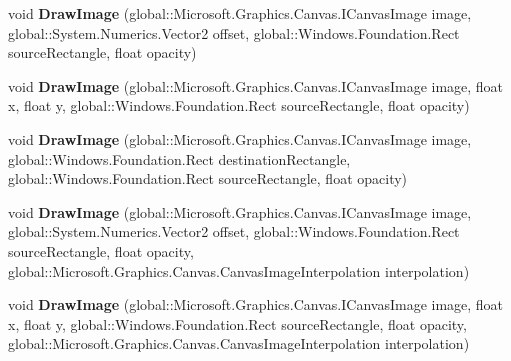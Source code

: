 \begin{DoxyCompactItemize}
void {\bfseries Draw\+Image} (global\+::\+Microsoft.\+Graphics.\+Canvas.\+I\+Canvas\+Image image, global\+::\+System.\+Numerics.\+Vector2 offset, global\+::\+Windows.\+Foundation.\+Rect source\+Rectangle, float opacity)
\item 
\mbox{\label{interface_microsoft_1_1_graphics_1_1_canvas_1_1_i_canvas_drawing_session_a21d76b9febfc14d4e7de5fc50a90605d}} 
void {\bfseries Draw\+Image} (global\+::\+Microsoft.\+Graphics.\+Canvas.\+I\+Canvas\+Image image, float x, float y, global\+::\+Windows.\+Foundation.\+Rect source\+Rectangle, float opacity)
\item 
\mbox{\label{interface_microsoft_1_1_graphics_1_1_canvas_1_1_i_canvas_drawing_session_aa765d0fa935b76101e503c6434376586}} 
void {\bfseries Draw\+Image} (global\+::\+Microsoft.\+Graphics.\+Canvas.\+I\+Canvas\+Image image, global\+::\+Windows.\+Foundation.\+Rect destination\+Rectangle, global\+::\+Windows.\+Foundation.\+Rect source\+Rectangle, float opacity)
\item 
\mbox{\label{interface_microsoft_1_1_graphics_1_1_canvas_1_1_i_canvas_drawing_session_a9e068a61002b3491bc70ea21e2ee8517}} 
void {\bfseries Draw\+Image} (global\+::\+Microsoft.\+Graphics.\+Canvas.\+I\+Canvas\+Image image, global\+::\+System.\+Numerics.\+Vector2 offset, global\+::\+Windows.\+Foundation.\+Rect source\+Rectangle, float opacity, global\+::\+Microsoft.\+Graphics.\+Canvas.\+Canvas\+Image\+Interpolation interpolation)
\item 
\mbox{\label{interface_microsoft_1_1_graphics_1_1_canvas_1_1_i_canvas_drawing_session_aa7b11bec4901a474249edf660e7decd5}} 
void {\bfseries Draw\+Image} (global\+::\+Microsoft.\+Graphics.\+Canvas.\+I\+Canvas\+Image image, float x, float y, global\+::\+Windows.\+Foundation.\+Rect source\+Rectangle, float opacity, global\+::\+Microsoft.\+Graphics.\+Canvas.\+Canvas\+Image\+Interpolation interpolation)
\item 
\mbox{\label{interface_microsoft_1_1_graphics_1_1_canvas_1_1_i_canvas_drawing_session_a95fe7324d80e934f84faf2e041b53f43}} 

\end{DoxyCompactItemize}
